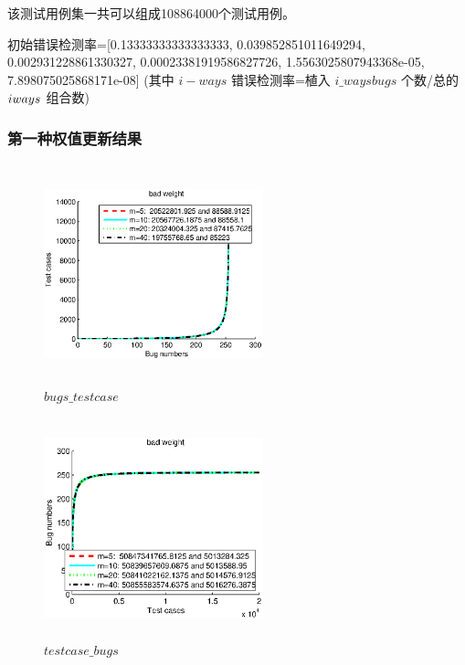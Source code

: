 \documentclass[10pt,journal,letterpaper,compsoc]{IEEEtran}
\begin{document}
\begin{CJK}{UTF8}{gkai}
	该测试用例集一共可以组成108864000个测试用例。

	初始错误检测率=[0.13333333333333333, 0.039852851011649294, 0.002931228861330327, 0.00023381919586827726, 1.5563025807943368e-05, 7.898075025868171e-08] 
(其中 $i-ways$ 错误检测率=植入 $i\_ways bugs$ 个数/总的 $i\-ways$ 组合数) 
    \subsubsection*{第一种权值更新结果}
 \begin{figure}[htb]
   \centering
   \includegraphics[width=2.5in,height=2.5in]{./a2_1_picture/bugs_testcase.eps}
   \caption{$bugs\_testcase$}
   \label{fig:ARCH}
 \end{figure}
 \begin{figure}[htb]
   \centering
   \includegraphics[width=2.5in,height=2.5in]{./a2_1_picture/testcase_bugs.eps}
   \caption{$testcase\_bugs$}
   \label{fig:ARCH}
 \end{figure}


\end{CJK}
\end{document}
